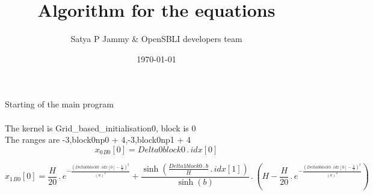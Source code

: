 \documentclass{article}
\title{Algorithm for the equations}
\author{Satya P Jammy \& OpenSBLI developers team}
\date{\today}
\begin{document}
\maketitle
\noindent Starting of the main program\\
\\\noindent The kernel is Grid_based_initialisation0, block is 0\\\noindent The ranges are -3,block0np0 + 4,-3,block0np1 + 4\\\begin{dmath}{x_{0}{_{B0}}}[{0}] = Delta0block0 \,.\, {idx}[{0}]\end{dmath}

\begin{dmath}{x_{1}{_{B0}}}[{0}] = \frac{H}{20} \,.\, e^{- \frac{\left(Delta0block0 \,.\, {idx}[{0}] - \frac{L}{2} \right)^{2}}{\left(a \right)^{2}}} + \frac{\sinh{\left (\frac{Delta1block0 \,.\, b}{H} \,.\, {idx}[{1}] \right )}}{\sinh{\left (b 
\right )}} \,.\, \left(H - \frac{H}{20} \,.\, e^{- \frac{\left(Delta0block0 \,.\, {idx}[{0}] - \frac{L}{2} \right)^{2}}{\left(a \right)^{2}}}\right)\end{dmath}
\end{document}
